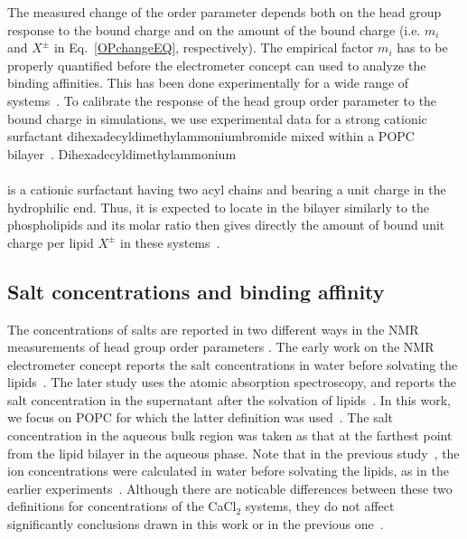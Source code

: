 \documentclass[aip,jcp,twocolumn]{revtex4}
\begin{document}
The measured change of the order parameter depends both on the head group response 
to the bound charge and on the amount of the bound charge 
(i.e. $m_i$ and $X^\pm$ in Eq.~\ref{OPchangeEQ}, respectively). 
The empirical factor $m_i$ has to be
properly quantified before the electrometer concept can used to 
analyze the binding affinities.
This has been done experimentally for a wide range
of systems~\cite{seelig87,beschiasvili91}. To calibrate 
the response of the head group order parameter to the bound charge in simulations,
we use experimental data for a strong cationic surfactant dihexadecyldimethylammoniumbromide %
mixed within a POPC bilayer~\cite{scherer89}. Dihexadecyldimethylammonium\\[0.5cm]
\vspace{0.5cm} \\
is a cationic surfactant having two acyl chains and bearing a unit
charge in the hydrophilic end. Thus, it is expected to locate
in the bilayer similarly to the phospholipids and its molar ratio then 
gives directly the amount of bound unit charge per lipid $X^\pm$ in these systems~\cite{scherer89}.

\subsection{Salt concentrations and binding affinity}
The concentrations of salts are reported in two different ways
in the NMR measurements of head group order parameters \cite{akutsu81, altenbach84}.
The early work on the NMR electrometer concept 
reports the salt concentrations in water before solvating
the lipids~\cite{akutsu81}. 
The later study uses the atomic absorption
spectroscopy, and reports the salt concentration in the supernatant after the
solvation of lipids~\cite{altenbach84}.
In this work, we focus on POPC for which the latter definition was used~\cite{altenbach84}.
The salt concentration in the aqueous bulk region was taken as that at 
the farthest point from the lipid bilayer in the aqueous phase. 
Note that in the previous study~\cite{catte16},
the ion concentrations were calculated in water before solvating the lipids, 
as in the earlier experiments~\cite{akutsu81}.
Although there are noticable differences between these two
definitions for concentrations of the CaCl$_2$ systems,
they do not affect significantly conclusions drawn in this work or in the previous one~\cite{catte16}.
\end{document}
